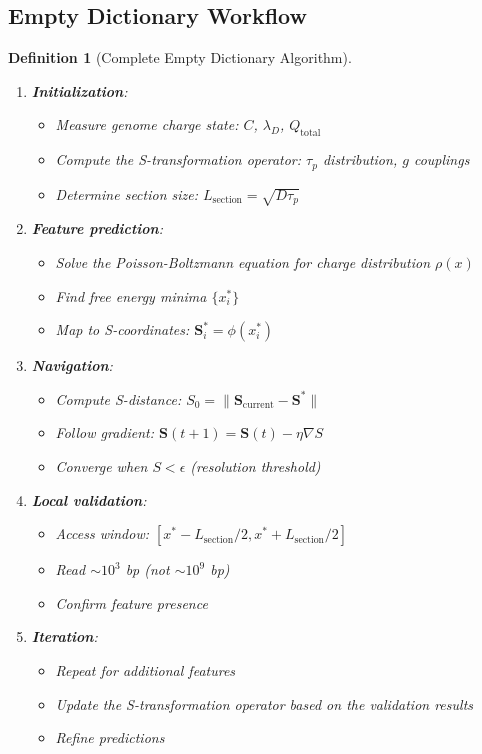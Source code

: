 \documentclass[11pt,a4paper]{article}
\newtheorem{definition}[theorem]{Definition}
\theoremstyle{remark}
\newcommand{\Scoord}{\mathbf{S}}
\begin{document}
\subsection{Empty Dictionary Workflow}

\begin{definition}[Complete Empty Dictionary Algorithm]
\label{def:empty_dictionary_algorithm}
\begin{enumerate}
\item \textbf{Initialization}:
   \begin{itemize}
   \item Measure genome charge state: $C$, $\lambda_D$, $Q_{\text{total}}$
   \item Compute the S-transformation operator: $\tau_p$ distribution, $g$ couplings
   \item Determine section size: $L_{\text{section}} = \sqrt{D\tau_p}$
   \end{itemize}

\item \textbf{Feature prediction}:
   \begin{itemize}
   \item Solve the Poisson-Boltzmann equation for charge distribution $\rho(x)$
   \item Find free energy minima $\{x_i^*\}$
   \item Map to S-coordinates: $\Scoord_i^* = \phi(x_i^*)$
   \end{itemize}

\item \textbf{Navigation}:
   \begin{itemize}
   \item Compute S-distance: $S_0 = \|\Scoord_{\text{current}} - \Scoord^*\|$
   \item Follow gradient: $\Scoord(t+1) = \Scoord(t) - \eta\nabla S$
   \item Converge when $S < \epsilon$ (resolution threshold)
   \end{itemize}

\item \textbf{Local validation}:
   \begin{itemize}
   \item Access window: $[x^* - L_{\text{section}}/2, x^* + L_{\text{section}}/2]$
   \item Read $\sim 10^3$ bp (not $\sim 10^9$ bp)
   \item Confirm feature presence
   \end{itemize}

\item \textbf{Iteration}:
   \begin{itemize}
   \item Repeat for additional features
   \item Update the S-transformation operator based on the validation results
   \item Refine predictions
   \end{itemize}
\end{enumerate}
\end{definition}
\end{document}
